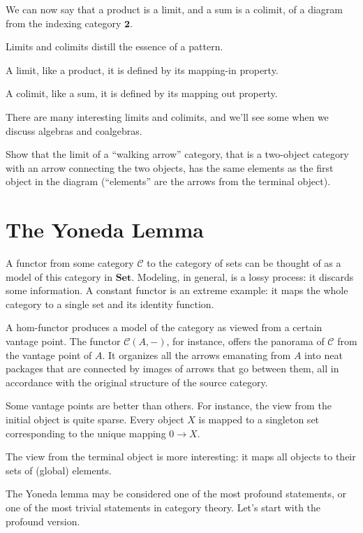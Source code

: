 \documentclass[DaoFP]{subfiles}
\begin{document}
We can now say that a product is a limit, and a sum is a colimit, of a diagram from the indexing category $\mathbf{2}$.

Limits and colimits distill the essence of a pattern. 

A limit, like a product, it is defined by its mapping-in property. 

A colimit, like a sum, it is defined by its mapping out property.

There are many interesting limits and colimits, and we'll see some when we discuss algebras and coalgebras.

\begin{exercise}
Show that the limit of a ``walking arrow'' category, that is a two-object category with an arrow connecting the two objects, has the same elements as the first object in the diagram (``elements'' are the arrows from the terminal object).
\end{exercise}

\section{The Yoneda Lemma}

A functor from some category $\mathcal{C}$ to the category of sets can be thought of as a model of this category in $\mathbf{Set}$. Modeling, in general, is a lossy process: it discards some information. A constant functor is an extreme example: it maps the whole category to a single set and its identity function. 

A hom-functor produces a model of the category as viewed from a certain vantage point. The functor $\mathcal{C}(A, -)$, for instance, offers the panorama of $\mathcal{C}$ from the vantage point of $A$. It organizes all the arrows emanating from $A$ into neat packages that are connected by images of arrows that go between them, all in accordance with the original structure of the source category. 

Some vantage points are better than others. For instance, the view from the initial object is quite sparse. Every object $X$ is mapped to a singleton set corresponding to the unique mapping $0 \to X$. 

The view from the terminal object is more interesting: it maps all objects to their sets of (global) elements. 

The Yoneda lemma may be considered one of the most profound statements, or one of the most trivial statements in category theory. Let's start with the profound version. 
\end{document}
